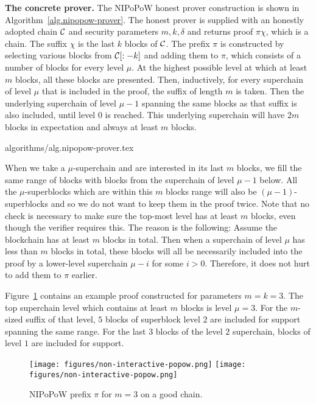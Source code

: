\noindent
\textbf{The concrete prover.}
The NIPoPoW honest prover construction is shown in
Algorithm~\ref{alg.nipopow-prover}. The honest prover is supplied with an
honestly adopted chain $\mathcal{C}$ and security parameters $m, k, \delta$ and
returns proof $\pi\chi$, which is a chain. The suffix $\chi$ is the last $k$
blocks of $\mathcal{C}$. The prefix $\pi$ is constructed by selecting various blocks
from $\mathcal{C}[:-k]$ and adding them to $\pi$, which consists of a number of
blocks for every level $\mu$. At the highest possible level at which at least
$m$ blocks, all these blocks are presented. Then, inductively, for every
superchain of level $\mu$ that is included in the proof, the suffix of length
$m$ is taken. Then the underlying superchain of level $\mu - 1$ spanning the
same blocks as that suffix is also included, until level $0$ is reached. This
underlying superchain will have $2m$ blocks in expectation and always at least
$m$ blocks.

{algorithms/alg.nipopow-prover.tex}

When we take a $\mu$-superchain and are interested in its last $m$ blocks, we
fill the same range of blocks with blocks from the superchain of level $\mu - 1$
below. All the $\mu$-superblocks which are within this $m$ blocks range
will also be $(\mu-1)$-superblocks and so we do not want to keep them
in the proof twice. Note that no check is necessary to
make sure the top-most level has at least $m$ blocks, even though the verifier
requires this. The reason is the following: Assume the blockchain has at least
$m$ blocks in total. Then when a superchain of level $\mu$ has less than $m$
blocks in total, these blocks will all be necessarily included into the proof by
a lower-level superchain $\mu - i$ for some $i > 0$. Therefore, it does not hurt
to add them to $\pi$ earlier.

Figure~\ref{fig.nipopow} contains an example proof constructed for parameters
$m = k = 3$. The top superchain level which contains at least $m$ blocks is
level $\mu = 3$. For the $m$-sized suffix of that level, $5$ blocks of
superblock level $2$ are included for support spanning the same range. For the
last $3$ blocks of the level $2$ superchain, blocks of level $1$ are included
for support.

\begin{figure}[h]
    \caption{
    NIPoPoW prefix $\pi$ for $m = 3$ on a good chain.
    }
    \centering
    \iftwocolumn
        \texttt{[image: figures/non-interactive-popow.png]}
    \else
        \texttt{[image: figures/non-interactive-popow.png]}
    \fi
    \label{fig.nipopow}
\end{figure}

